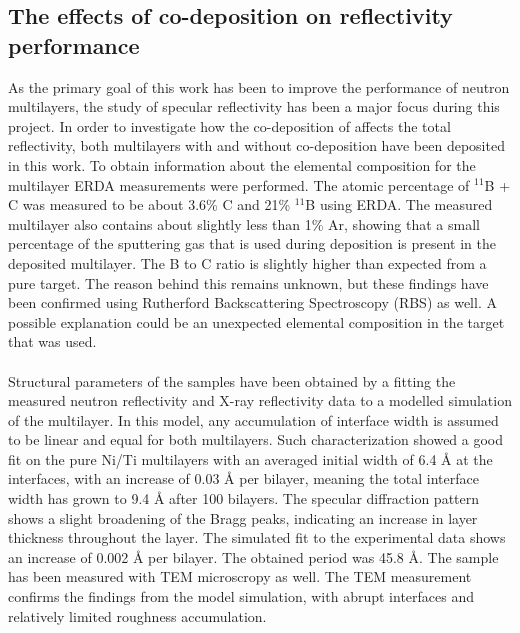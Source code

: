 \subsection{The effects of \BC co-deposition on reflectivity performance}
As the primary goal of this work has been to improve the performance of neutron multilayers, the study of specular reflectivity has been a major focus during this project. In order to investigate how the co-deposition of \BC affects the total reflectivity, both multilayers with and without \BC co-deposition have been deposited in this work. To obtain information about the elemental composition for the multilayer ERDA measurements were performed. The atomic percentage of $^{\textrm{11}}$B + C was measured to be about 3.6\% C and 21\% $^{\textrm{11}}$B using ERDA. The measured multilayer also contains about slightly less than 1\% Ar, showing that a small percentage of the sputtering gas that is used during deposition is present in the deposited multilayer. The B to C ratio is slightly higher than expected from a pure \BC target. The reason behind this remains unknown, but these findings have been confirmed using Rutherford Backscattering Spectroscopy (RBS) as well. A possible explanation could be an unexpected elemental composition in the target that was used.
\\
\\
Structural parameters of the samples have been obtained by a fitting the measured neutron reflectivity and X-ray reflectivity data to a modelled simulation of the multilayer. In this model, any accumulation of interface width is assumed to be linear and equal for both multilayers. Such characterization showed a good fit on the pure Ni/Ti multilayers with an averaged initial width of 6.4 Å at the interfaces, with an increase of 0.03 Å per bilayer, meaning the total interface width has grown to 9.4 Å after 100 bilayers. The specular diffraction pattern shows a slight broadening of the Bragg peaks, indicating an increase in layer thickness throughout the layer. The simulated fit to the experimental data shows an increase of 0.002 Å per bilayer. The obtained period was 45.8 Å. The sample has been measured with TEM microscropy as well. The TEM measurement confirms the findings from the model simulation, with abrupt interfaces and relatively limited roughness accumulation.\\

